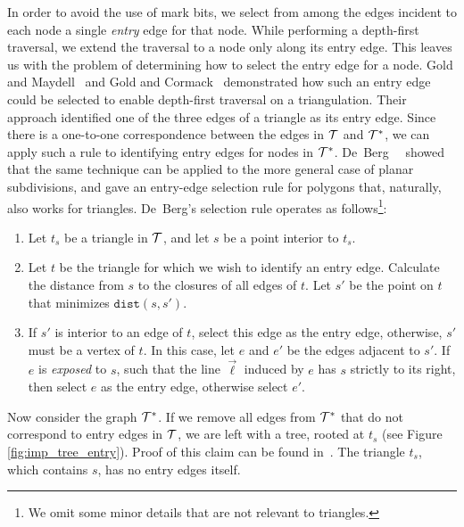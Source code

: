 {  In order to avoid the use of mark bits, we select from among the edges incident 
  to each node a single \emph{entry} edge for that node. 
  While performing a depth-first traversal, we extend the traversal 
  to a node only along its entry edge.
  This leaves us with the problem of determining how to select the entry edge
  for a node.  
  Gold and Maydell~\cite{gold_maydell_1978} and Gold and 
  Cormack~\cite{gold_cormack86} demonstrated how such an entry edge could 
  be selected to enable depth-first traversal on a triangulation.
  Their approach identified one of the three edges of a triangle as its 
  entry edge.
  Since there is a one-to-one correspondence between the edges in $\mathcal{T}$ 
  and $\mathcal{T}^*$, we can apply such a rule to identifying entry
  edges for nodes in $\mathcal{T}^*$. 
  De~Berg~\etal~\cite{deberg_et_al_1997} showed that the same technique can 
  be applied to the more general case of planar subdivisions, and 
  gave an entry-edge selection rule for polygons that, naturally, also works 
  for triangles.
  De~Berg's selection rule operates as follows\footnote{We 
  omit some minor details that are not relevant to triangles.}:

  \begin{enumerate}
  \item Let $t_s$ be a triangle in $\mathcal{T}$, and let $s$ be a point interior
  to $t_s$.
  \item Let $t$ be the triangle for which we wish to identify an entry edge.
  Calculate the distance from $s$ to the closures of all edges of $t$.
  Let $s'$ be the point on $t$ that minimizes $\texttt{dist}(s,s')$. 
  \item If $s'$ is interior to an edge of $t$, select this edge as the
  entry edge, otherwise, $s'$ must be a vertex of $t$. 
  In this case, let $e$ and $e'$ be the edges adjacent to $s'$. 
  If $e$ is \emph{exposed} to $s$, such that the line $\vec{\ell}$ induced by 
  $e$ has $s$ strictly to its right, then select $e$ as the entry edge, otherwise
  select $e'$. 
  \end{enumerate}

  Now consider the graph $\mathcal{T}^*$.
  If we remove all edges from $\mathcal{T}^*$ that
  do not correspond to entry edges in $\mathcal{T}$, we are left with a tree, 
  rooted at $t_s$ (see Figure \ref{fig:imp_tree_entry}).
  Proof of this claim can be found in~\cite{deberg_et_al_1997}.
  The triangle $t_s$, which contains $s$, has no entry edges itself.

}
